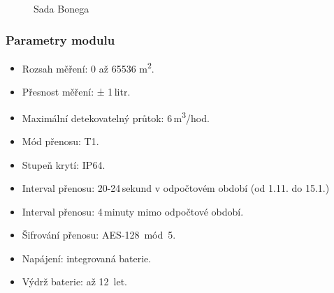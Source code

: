 	\begin{figure}[!ht]
	\vspace{-15pt}
    \centering
			\hspace*{5mm}
			\hspace*{5mm}
		\caption{Sada Bonega~\cite{CidloBonega}}
\end{figure}


\vspace{-30pt}
\subsubsection{Parametry modulu}
\begin{itemize}
	\item Rozsah měření: 0 až 65536 m\textsuperscript{2}.
	\item Přesnost měření: ± 1\,litr.
	\item Maximální detekovatelný průtok: 6\,m\textsuperscript{3}/hod.
	\item Mód přenosu: T1.
	\item Stupeň krytí: IP64.
	\item Interval přenosu: 20-24\,sekund v odpočtovém období (od 1.11. do 15.1.)
	\item Interval přenosu: 4\,minuty mimo odpočtové období.
	\item Šifrování přenosu: AES-128~mód~5.
	\item Napájení: integrovaná baterie.
	\item Výdrž baterie: až 12~let.
\end{itemize}


